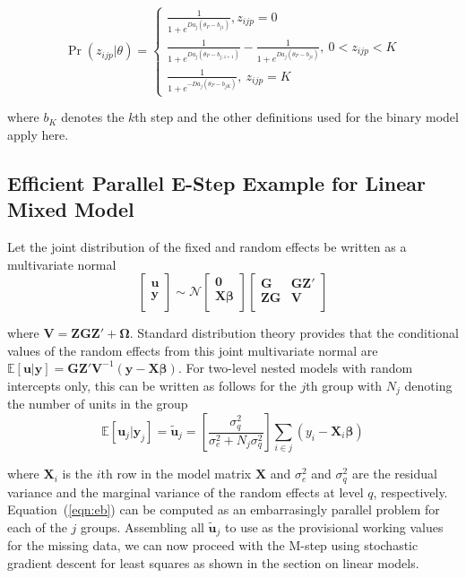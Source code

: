\documentclass[12pt]{article}
\begin{document}
\begin{equation}
\Pr(z_{ijp}|\theta)=\left\{  \begin{array}{c}
\frac{1}{1+e^{Da_j(\theta_P-b_{j1})}},z_{ijp}=0 \\
\frac{1}{1+e^{Da_j(\theta_P-b_{j,z+1})}} - \frac{1}{1+e^{Da_j(\theta_P-b_{jz})}}, \ 0 < z_{ijp} < K \\
\frac{1}{1+e^{-Da_j(\theta_P-b_{jK})}},\ z_{ijp}=K 
 \end{array} \right. 
\end{equation} 
 
\noindent where $b_K$ denotes the $k$th step and the other definitions used for the binary model apply here.

\subsection*{Efficient Parallel E-Step Example for Linear Mixed Model}

Let the joint distribution of the fixed and random effects be written as a multivariate normal
\begin{equation}
\left [ 
\begin{array}{cc}
\bm{u} \\
\bm{y} \\
\end{array}
\right ]
\sim \mathcal{N}
\left [ 
\begin{array}{cc}
\bm{0} \\
\bm{X\beta} \\
\end{array}
\right ]
\left [ 
\begin{array}{cccc}
\bm{G} & \bm{GZ'} \\
\bm{ZG} & \bm{V} \\
\end{array}
\right ]
\end{equation}

\noindent where $\bm{V} = \bm{ZGZ'} + \bm{\Omega}$. Standard distribution theory provides that the conditional values of the random effects from this joint multivariate normal are $\mathbb{E}[\bm{u}|\bm{y}]  = \bm{GZ'V}^{-1}(\bm{y}-\bm{X\beta})$. For two-level nested models with random intercepts only, this can be written as follows for the $j$th group with $N_j$ denoting the number of units in the group
\begin{equation}
\label{eqn:eb}
\mathbb{E}[\bm{u}_j|\bm{y}_j] = \bm{\widetilde{u}}_j = \left[\frac{\sigma_{q}^2}{\sigma_{e}^2 + N_{j}\sigma_{q}^2}\right] \sum_{i \in j} \left(y_{i} - \bm{X}_i\bm{\beta}\right)
\end{equation}

\noindent where $\bm{X}_i$ is the $i$th row in the model matrix $\bm{X}$ and $\sigma_{e}^2$ and $\sigma_{q}^2$ are the residual variance and the marginal variance of the random effects at level $q$, respectively. Equation~(\ref{eqn:eb}) can be computed as an embarrasingly parallel problem for each of the $j$ groups. Assembling all $\bm{\widetilde{u}}_j$ to use as the provisional working values for the missing data, we can now proceed with the M-step using stochastic gradient descent for least squares as shown in the section on linear models. 


\clearpage 
 
\end{document}
